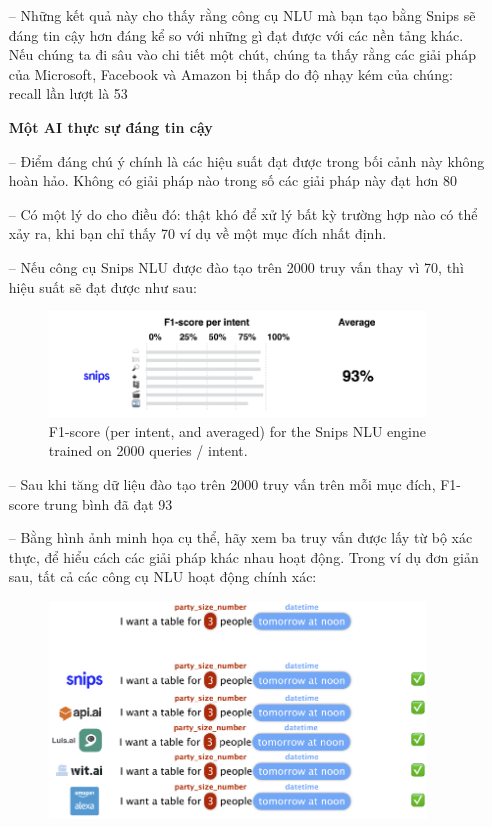 \begin{itemize}
	\item[--]Những kết quả này cho thấy rằng công cụ NLU mà bạn tạo bằng Snips sẽ đáng tin cậy hơn đáng kể so với những gì đạt được với các nền tảng khác. Nếu chúng ta đi sâu vào chi tiết một chút, chúng ta thấy rằng các giải pháp của Microsoft, Facebook và Amazon bị thấp do độ nhạy kém của chúng: recall lần lượt là 53%
	
	\textbf{Một AI thực sự đáng tin cậy} 
	
	\item[--]Điểm đáng chú ý chính là các hiệu suất đạt được trong bối cảnh này không hoàn hảo. Không có giải pháp nào trong số các giải pháp này đạt hơn 80%
	
	\item[--]Có một lý do cho điều đó: thật khó để xử lý bất kỳ trường hợp nào có thể xảy ra, khi bạn chỉ thấy 70 ví dụ về một mục đích nhất định.
	
	\item[--]Nếu công cụ Snips NLU được đào tạo trên 2000 truy vấn thay vì 70, thì hiệu suất sẽ đạt được như sau:
	
		\begin{figure}[htp]
    \centering
    \includegraphics[width=10cm]{images/ComparisonOfNLU/f1Score2000Intents.png}
    \caption{F1-score (per intent, and averaged) for the Snips NLU engine trained on 2000 queries / intent.}
    \label{fig:system-class-intent}
		\end{figure}
		
	
	\item[--]Sau khi tăng dữ liệu đào tạo trên 2000 truy vấn trên mỗi mục đích, F1-score trung bình đã đạt 93%
	
	\item[--]Bằng hình ảnh minh họa cụ thể, hãy xem ba truy vấn được lấy từ bộ xác thực, để hiểu cách các giải pháp khác nhau hoạt động. Trong ví dụ đơn giản sau, tất cả các công cụ NLU hoạt động chính xác:
	
	\begin{figure}[htp]
    \centering
    \includegraphics[width=10cm]{images/ComparisonOfNLU/slotfilling1.png}
    

\end{figure}
\end{itemize}
